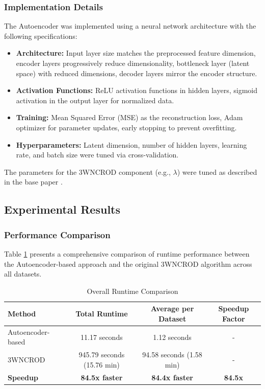 \documentclass[12pt,a4paper]{article}
\begin{document}
\subsubsection{Implementation Details}

The Autoencoder was implemented using a neural network architecture with the following specifications:

\begin{itemize}
\item \textbf{Architecture:} Input layer size matches the preprocessed feature dimension, encoder layers progressively reduce dimensionality, bottleneck layer (latent space) with reduced dimensions, decoder layers mirror the encoder structure.
\item \textbf{Activation Functions:} ReLU activation functions in hidden layers, sigmoid activation in the output layer for normalized data.
\item \textbf{Training:} Mean Squared Error (MSE) as the reconstruction loss, Adam optimizer for parameter updates, early stopping to prevent overfitting.
\item \textbf{Hyperparameters:} Latent dimension, number of hidden layers, learning rate, and batch size were tuned via cross-validation.
\end{itemize}

The parameters for the 3WNCROD component (e.g., $\lambda$) were tuned as described in the base paper \cite{zhang2024}.

\subsection{Experimental Results}

\subsubsection{Performance Comparison}

Table \ref{tab:runtime_comparison} presents a comprehensive comparison of runtime performance between the Autoencoder-based approach and the original 3WNCROD algorithm across all datasets.

\begin{table}[h]
\centering
\caption{Overall Runtime Comparison}
\label{tab:runtime_comparison}
\begin{tabular}{lccc}
\toprule
\textbf{Method} & \textbf{Total Runtime} & \textbf{Average per Dataset} & \textbf{Speedup Factor} \\
\midrule
Autoencoder-based & 11.17 seconds & 1.12 seconds & - \\
3WNCROD & 945.79 seconds (15.76 min) & 94.58 seconds (1.58 min) & - \\
\textbf{Speedup} & \textbf{84.5x faster} & \textbf{84.4x faster} & \textbf{84.5x} \\
\bottomrule
\end{tabular}
\end{table}
\end{document}
